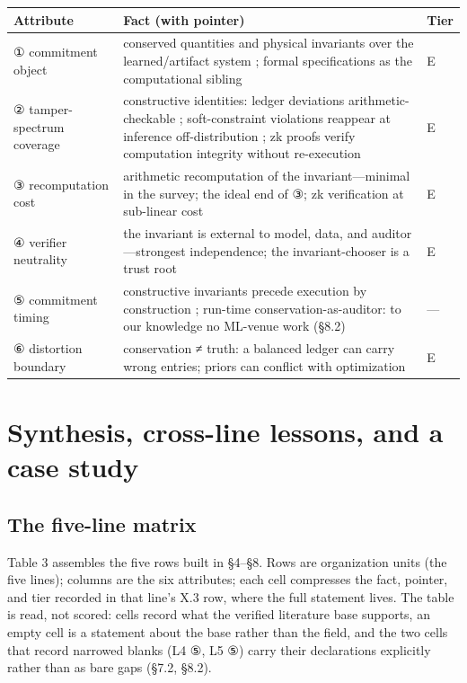 \documentclass[11pt,a4paper]{article}
\begin{document}
\begin{table}[htbp]
\centering
\footnotesize
\setlength{\tabcolsep}{3.5pt}
\renewcommand{\arraystretch}{1.18}
\begin{tabularx}{0.985\textwidth}{>{\raggedright\arraybackslash}p{} >{\raggedright\arraybackslash}X >{\raggedright\arraybackslash}p{}}
\toprule
\textbf{Attribute} & \textbf{Fact (with pointer)} & \textbf{Tier} \\
\midrule
① commitment object & conserved quantities and physical invariants over the learned\slash artifact system \cite{key11,key12,key13}; formal specifications as the computational sibling \cite{key52,key53,key54} & E \\
② tamper-spectrum coverage & constructive identities: ledger deviations arithmetic-checkable \cite{key11}; soft-constraint violations reappear at inference off-distribution \cite{key12,key13}; zk proofs verify computation integrity without re-execution \cite{key53} & E \\
③ recomputation cost & arithmetic recomputation of the invariant—minimal in the survey; the ideal end of ③; zk verification at sub-linear cost \cite{key53} & E \\
④ verifier neutrality & the invariant is external to model, data, and auditor—strongest independence; the invariant-chooser is a trust root \cite{key11,key12,key13} & E \\
⑤ commitment timing & constructive invariants precede execution by construction \cite{key11}; run-time conservation-as-auditor: to our knowledge no ML-venue work (§8.2) & — \\
⑥ distortion boundary & conservation ≠ truth: a balanced ledger can carry wrong entries; priors can conflict with optimization \cite{key13} & E \\
\bottomrule
\end{tabularx}
\end{table}

\section{Synthesis, cross-line lessons, and a case study}

\subsection{The five-line matrix}

Table 3 assembles the five rows built in §4–§8. Rows are organization units (the five lines); columns are the six attributes; each cell compresses the fact, pointer, and tier recorded in that line's X.3 row, where the full statement lives. The table is read, not scored: cells record what the verified literature base supports, an empty cell is a statement about the base rather than the field, and the two cells that record narrowed blanks (L4 ⑤, L5 ⑤) carry their declarations explicitly rather than as bare gaps (§7.2, §8.2).
\end{document}

